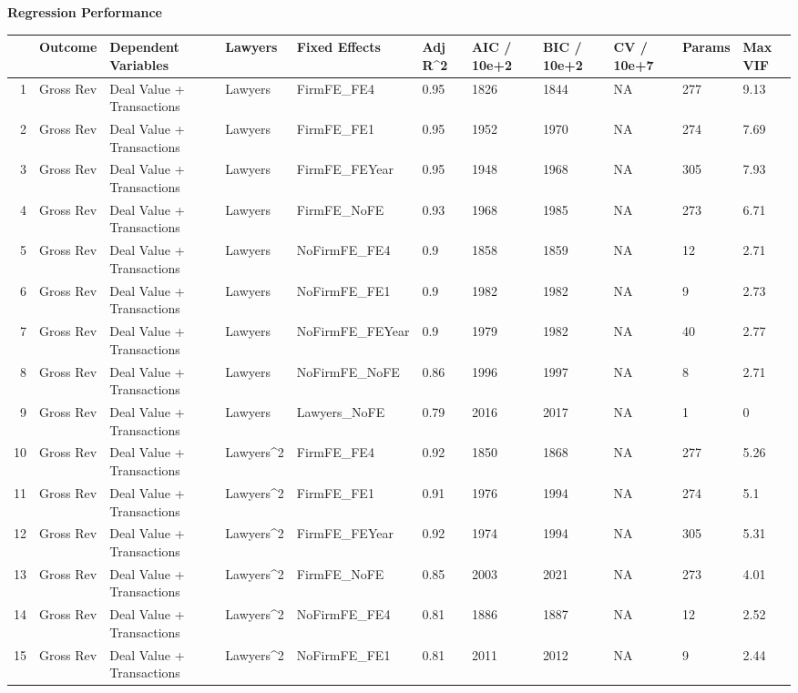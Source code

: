 \documentclass{article}
\begin{document}
\newpage
{\large \textbf{Regression Performance} }%
\begin{table}[H]
\centering
\begin{tabular}{rllllllllll}
  \hline
 & Outcome & Dependent Variables & Lawyers & Fixed Effects & Adj R^2 & AIC / 10e+2 & BIC / 10e+2 & CV / 10e+7 & Params & Max VIF \\
  \hline
1 & Gross Rev & Deal Value + Transactions & Lawyers & FirmFE\_FE4 & 0.95 & 1826 & 1844 & NA & 277 & 9.13 \\
  2 & Gross Rev & Deal Value + Transactions & Lawyers & FirmFE\_FE1 & 0.95 & 1952 & 1970 & NA & 274 & 7.69 \\
  3 & Gross Rev & Deal Value + Transactions & Lawyers & FirmFE\_FEYear & 0.95 & 1948 & 1968 & NA & 305 & 7.93 \\
  4 & Gross Rev & Deal Value + Transactions & Lawyers & FirmFE\_NoFE & 0.93 & 1968 & 1985 & NA & 273 & 6.71 \\
  5 & Gross Rev & Deal Value + Transactions & Lawyers & NoFirmFE\_FE4 & 0.9 & 1858 & 1859 & NA & 12 & 2.71 \\
  6 & Gross Rev & Deal Value + Transactions & Lawyers & NoFirmFE\_FE1 & 0.9 & 1982 & 1982 & NA & 9 & 2.73 \\
  7 & Gross Rev & Deal Value + Transactions & Lawyers & NoFirmFE\_FEYear & 0.9 & 1979 & 1982 & NA & 40 & 2.77 \\
  8 & Gross Rev & Deal Value + Transactions & Lawyers & NoFirmFE\_NoFE & 0.86 & 1996 & 1997 & NA & 8 & 2.71 \\
  9 & Gross Rev & Deal Value + Transactions & Lawyers & Lawyers\_NoFE & 0.79 & 2016 & 2017 & NA & 1 & 0 \\
  10 & Gross Rev & Deal Value + Transactions & Lawyers^2 & FirmFE\_FE4 & 0.92 & 1850 & 1868 & NA & 277 & 5.26 \\
  11 & Gross Rev & Deal Value + Transactions & Lawyers^2 & FirmFE\_FE1 & 0.91 & 1976 & 1994 & NA & 274 & 5.1 \\
  12 & Gross Rev & Deal Value + Transactions & Lawyers^2 & FirmFE\_FEYear & 0.92 & 1974 & 1994 & NA & 305 & 5.31 \\
  13 & Gross Rev & Deal Value + Transactions & Lawyers^2 & FirmFE\_NoFE & 0.85 & 2003 & 2021 & NA & 273 & 4.01 \\
  14 & Gross Rev & Deal Value + Transactions & Lawyers^2 & NoFirmFE\_FE4 & 0.81 & 1886 & 1887 & NA & 12 & 2.52 \\
  15 & Gross Rev & Deal Value + Transactions & Lawyers^2 & NoFirmFE\_FE1 & 0.81 & 2011 & 2012 & NA & 9 & 2.44 \\

\end{tabular}
\end{table}
\end{document}
